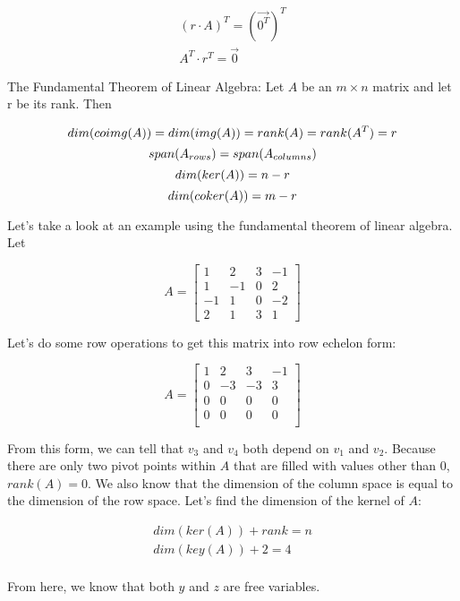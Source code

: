   \begin{align*}
    (r\cdot A)^T=(\vec{0^T})^T\\
    A^T\cdot r^T=\vec{0}
  \end{align*}

  \begin{theorem}
    The Fundamental Theorem of Linear Algebra: Let $A$ be an $m\times n$ matrix and let r be its rank. Then

    \[
      dim(coimg(A))=dim(img(A))=rank(A)=rank(A^T)=r\\
    \]
    \[
      span(A_{rows})=span(A_{columns})\\
    \]
    \[
      dim(ker(A))=n-r\\
    \]
    \[
      dim(coker(A))=m-r\\
    \]
  \end{theorem}

  Let's take a look at an example using the fundamental theorem of linear algebra. Let

  \[
    A=\begin{bmatrix}
      1&2&3&-1\\
      1&-1&0&2\\
      -1&1&0&-2\\
      2&1&3&1
    \end{bmatrix}
  \]

  Let's do some row operations to get this matrix into row echelon form:

  \[
    A=\begin{bmatrix}
      1&2&3&-1\\
      0&-3&-3&3\\
      0&0&0&0\\
      0&0&0&0\\
    \end{bmatrix}
  \]

  From this form, we can tell that $v_3$ and $v_4$ both depend on $v_1$ and $v_2$. Because there are only two pivot points within $A$ that are filled with values other than 0, $rank(A)=0$. We also know that the dimension of the column space is equal to the dimension of the row space. Let's find the dimension of the kernel of $A$:

  \begin{align*}
    dim(ker(A))+rank=n\\
    dim(key(A))+2=4\\
  \end{align*}

  From here, we know that both $y$ and $z$ are free variables.

